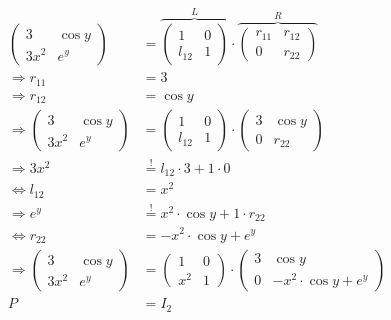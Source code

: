 \begin{align}
	\begin{pmatrix}
		3     & \cos y\\
		3 x^2 & e^y
	\end{pmatrix}
	&=
	\overbrace{\begin{pmatrix}
		1      & 0\\
		l_{12} & 1
	\end{pmatrix}}^L \cdot 
	\overbrace{\begin{pmatrix}
		r_{11} & r_{12}\\
		0      & r_{22}
	\end{pmatrix}}^R\\
	\Rightarrow r_{11} &= 3\\
	\Rightarrow r_{12} &= \cos y\\
	\Rightarrow \begin{pmatrix}
		3     & \cos y\\
		3 x^2 & e^y
	\end{pmatrix}
	&=
	\begin{pmatrix}
		1      & 0\\
		l_{12} & 1
	\end{pmatrix} \cdot 
	\begin{pmatrix}
		3 & \cos y\\
		0 & r_{22}
	\end{pmatrix}\\
	\Rightarrow 3x^2 &\stackrel{!}{=} l_{12} \cdot 3 + 1 \cdot 0\\
	\Leftrightarrow l_{12} &= x^2\\
	\Rightarrow e^y &\stackrel{!}{=} x^2 \cdot \cos y + 1 \cdot r_{22}\\
	\Leftrightarrow r_{22} &= -x^2 \cdot \cos y + e^y\\
	\Rightarrow \begin{pmatrix}
		3     & \cos y\\
		3 x^2 & e^y
	\end{pmatrix}
	&=
	\begin{pmatrix}
		1   & 0\\
		x^2 & 1
	\end{pmatrix} \cdot 
	\begin{pmatrix}
		3 & \cos y\\
		0 & -x^2 \cdot \cos y + e^y
	\end{pmatrix}\\
	P &= I_2
\end{align}
